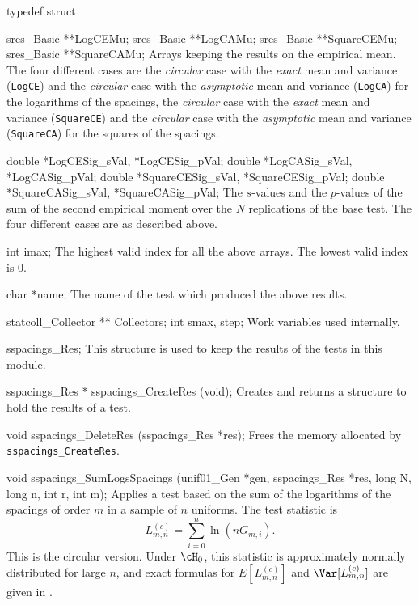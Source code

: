 typedef struct {

   sres_Basic **LogCEMu;
   sres_Basic **LogCAMu;
   sres_Basic **SquareCEMu;
   sres_Basic **SquareCAMu;
\endcode
 \tabb Arrays keeping the results on the empirical mean.
   The four different cases are the {\em circular} case with the {\em exact}
   mean and variance ({\tt LogCE}) and the {\em circular} case with the
   {\em asymptotic} mean and variance  ({\tt LogCA}) for the logarithms of the
   spacings, the {\em circular} case with the {\em exact} mean and variance
    ({\tt SquareCE})  and the {\em circular} case with the {\em asymptotic}
    mean and variance  ({\tt SquareCA}) for the squares of the spacings.
 \endtabb
\code

   double *LogCESig_sVal, *LogCESig_pVal;
   double *LogCASig_sVal, *LogCASig_pVal;
   double *SquareCESig_sVal, *SquareCESig_pVal;
   double *SquareCASig_sVal, *SquareCASig_pVal;
\endcode
 \tabb  The $s$-values and the $p$-values of the sum of the
   second empirical moment over the $N$ replications of the base test.
   The four different cases are as  described above.
 \endtabb
\code

   int imax;
\endcode
\tabb
   The  highest valid index for all the above arrays.
   The lowest valid index is 0.
\endtabb
\code

   char *name;
\endcode
 \tabb
  The name of the test which produced the above results.
 \endtabb
\fi  %
\hide %
\code

   statcoll_Collector ** Collectors;
   int smax, step;
\endcode
 \tabb
  Work variables used internally.
 \endtabb
\endhide %
\ifdetailed   %
\code

} sspacings_Res;
\endcode
 \tab
  This structure is used to keep the results of the tests in this module.
 \endtab
\code


sspacings_Res * sspacings_CreateRes (void);
\endcode
 \tab 
  Creates and returns a structure to hold the results of a test.
 \endtab
\code


void sspacings_DeleteRes (sspacings_Res *res);
\endcode
 \tab 
  Frees the memory allocated by {\tt sspacings\_CreateRes}.
 \endtab
\fi  %



\code

void sspacings_SumLogsSpacings (unif01_Gen *gen, sspacings_Res *res,
                                long N, long n, int r, int m);
\endcode
\tab
  Applies a test  based on the sum of the
  logarithms of the 
  spacings of order $m$ in a sample of $n$ uniforms.
  The test statistic is
 $$
  L_{m,n}^{(c)} = \sum_{i=0}^n \ln (n G_{m,i}).
 $$
  This is the circular version.
  Under $\cH_0$, this statistic is approximately normally distributed
  for large $n$, and exact formulas for $E[L_{m,n}^{(c)}]$ and 
  $\Var[L_{m,n}^{(c)}]$ are given in \cite{tCRE76a,rLEC97h}.
\endtab
\code


